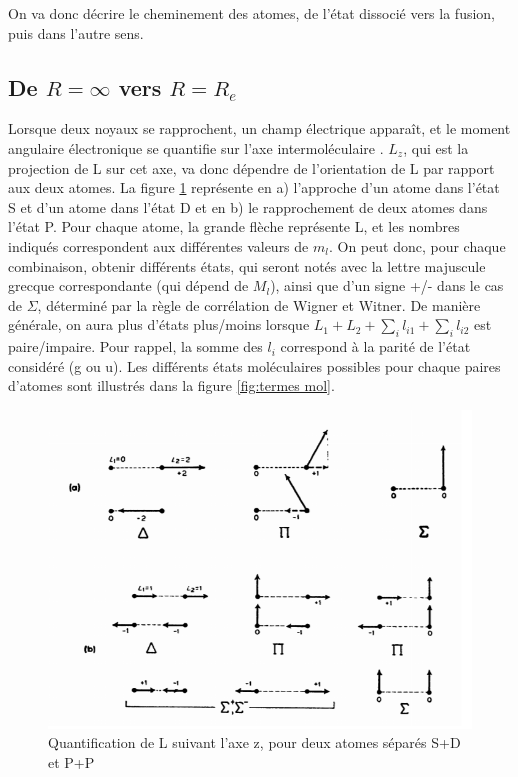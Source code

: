 On va donc décrire le cheminement des atomes, de l'état dissocié vers la fusion, puis dans l'autre sens.

\subsection{De $R=\infty$ vers $R=R_e$}

Lorsque deux noyaux se rapprochent, un champ électrique apparaît, et le moment angulaire électronique se quantifie sur l'axe intermoléculaire . $L_z$, qui est la projection de L sur cet axe, va donc dépendre de l'orientation de L par rapport aux deux atomes. La figure \ref{fig:quantification de L} représente en a) l'approche d'un atome dans l'état S et d'un atome dans l'état D et en b) le rapprochement de deux atomes dans l'état P. Pour chaque atome, la grande flèche représente L, et les nombres indiqués correspondent aux différentes valeurs de $m_l$. On peut donc, pour chaque combinaison, obtenir différents états, qui seront notés avec la lettre majuscule grecque correspondante (qui dépend de $M_l$), ainsi que d'un signe +/- dans le cas de $\Sigma$, déterminé par la règle de corrélation de Wigner et Witner. De manière générale, on aura plus d'états plus/moins lorsque $L_1+L_2+\sum_il_{i1}+\sum_il_{i2}$ est paire/impaire. Pour rappel, la somme des $l_i$ correspond à la parité de l'état considéré (g ou u). Les différents états moléculaires possibles pour chaque paires d'atomes sont illustrés dans la figure \ref{fig:termes mol}.
\newline
\begin{figure}[tpb]
    \centering
    \includegraphics[scale=0.75]{Images3/quantification de L.PNG}
    \caption{Quantification de L suivant l'axe z, pour deux atomes séparés S+D et P+P}
    \label{fig:quantification de L}
\end{figure}
